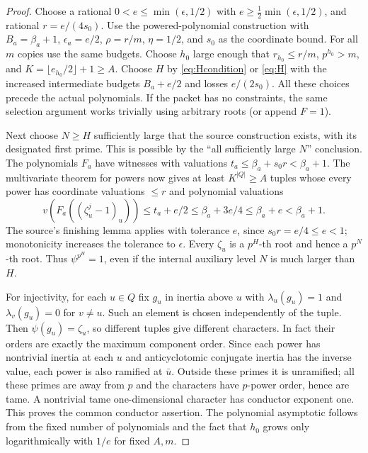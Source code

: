 \documentclass[11pt]{article}
\theoremstyle{remark}\newtheorem{remark}[theorem]{Remark}
\begin{document}
\begin{proof}
Choose a rational $0<e\le\min(\epsilon,1/2)$ with
$e\ge\tfrac12\min(\epsilon,1/2)$, and rational $r=e/(4s_0)$.
Use the powered-polynomial construction with $B_a=\beta_a+1$,
$\epsilon_a=e/2$, $\rho=r/m$, $\eta=1/2$, and $s_0$ as the coordinate
bound. For all $m$ copies use the same budgets. Choose $h_0$ large enough
that $r_{h_0}\le r/m$, $p^{h_0}>m$, and
$K=\lfloor e_{h_0}/2\rfloor+1\ge A$. Choose $H$ by
\eqref{eq:Hcondition} or \eqref{eq:H} with the increased intermediate
budgets $B_a+e/2$ and losses $e/(2s_0)$. All these choices precede the
actual polynomials. If the packet has no constraints, the same selection
argument works trivially using arbitrary roots (or append $F=1$).

Next choose $N\ge H$ sufficiently large that the source construction
exists, with its designated first prime. This is possible by the
``all sufficiently large $N$'' conclusion. The polynomials $F_a$ have
witnesses with valuations $t_a\le\beta_a+s_0r<\beta_a+1$.
The multivariate theorem for powers now gives at least
$K^{|Q|}\ge A$ tuples whose every power has coordinate valuations
$\le r$ and polynomial valuations
\[
 v(F_a((\zeta_u^j-1)_u))\le t_a+e/2
 \le\beta_a+3e/4\le\beta_a+e<\beta_a+1.
\]
The source's finishing lemma applies with tolerance $e$, since
$s_0r=e/4\le e<1$; monotonicity increases the tolerance to $\epsilon$.
Every $\zeta_u$ is a $p^H$-th root and hence a $p^N$-th root. Thus
$\psi^{p^H}=1$, even if the internal auxiliary level $N$ is much larger
than $H$.

For injectivity, for each $u\in Q$ fix $g_u$ in inertia above $u$ with
$\lambda_u(g_u)=1$ and $\lambda_v(g_u)=0$ for $v\ne u$. Such an
element is chosen independently of the tuple. Then $\psi(g_u)=\zeta_u$,
so different tuples give different characters. In fact their orders
are exactly the maximum component order. Since each power has nontrivial
inertia at each $u$ and anticyclotomic conjugate inertia has the inverse
value, each power is also ramified at $\bar u$. Outside these primes
it is unramified; all these primes are away from $p$ and the characters
have $p$-power order, hence are tame. A nontrivial tame one-dimensional
character has conductor exponent one. This proves the common conductor
assertion. The polynomial asymptotic follows from the fixed number of
polynomials and the fact that $h_0$ grows only logarithmically with
$1/e$ for fixed $A,m$.
\end{proof}
\end{document}
